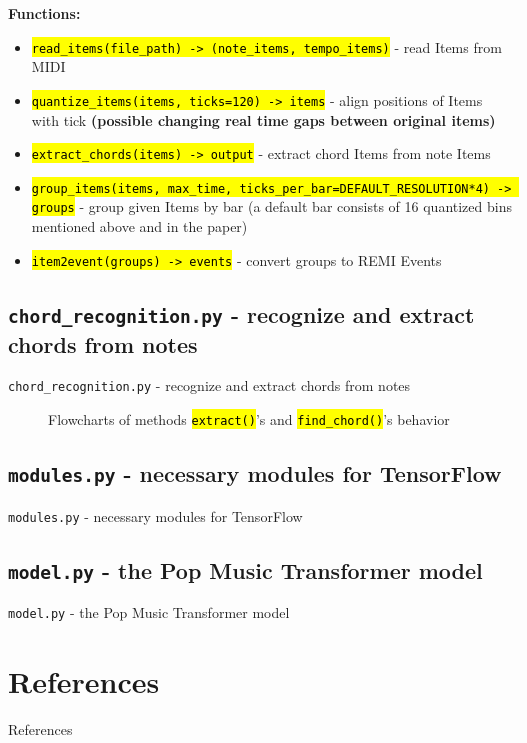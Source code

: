 \documentclass{beamer}
\newcommand{\thiss}{}
\newcommand{\thisss}{}
\newcommand{\code}[1]{\textcolor{ReddishOrange}{\hl{\texttt{#1}}}}
\begin{document}
\begin{frame}{\thiss}{\thisss}
    \textbf{Functions:}
    \begin{itemize}
        \item \code{read\_items(file\_path) -> (note\_items, tempo\_items)} - read Items from MIDI
        \item \code{quantize\_items(items, ticks=120) -> items} - align positions of Items with tick \textbf{(possible changing real time gaps between original items)}
        \item \code{extract\_chords(items) -> output} - extract chord Items from note Items
        \item \code{group\_items(items, max\_time, ticks\_per\_bar=DEFAULT\_RESOLUTION*4) -> groups} - group given Items by bar (a default bar consists of 16 quantized bins mentioned above and in the paper)
        \item \code{item2event(groups) -> events} - convert groups to REMI Events
    \end{itemize}
\end{frame}

\renewcommand{\thisss}{\texttt{chord\_recognition.py} - recognize and extract chords from notes}
\subsection{\thisss}
\begin{frame}{\thiss}{\thisss}
    \begin{center}
        \begin{figure}
            
            \hspace{2cm}
            
            \caption{Flowcharts of methods \code{extract()}'s and \code{find\_chord()}'s behavior}
        \end{figure}
    \end{center}
\end{frame}

\renewcommand{\thisss}{\texttt{modules.py} - necessary modules for TensorFlow}
\subsection{\thisss}
\begin{frame}{\thiss}{\thisss}
    
\end{frame}

\renewcommand{\thisss}{\texttt{model.py} - the Pop Music Transformer model}
\subsection{\thisss}
\begin{frame}{\thiss}{\thisss}
    
\end{frame}

\renewcommand{\thiss}{References}
\section{\thiss}
\begin{frame}[allowframebreaks]{\thiss}
    \printbibliography    
\end{frame}
\end{document}
